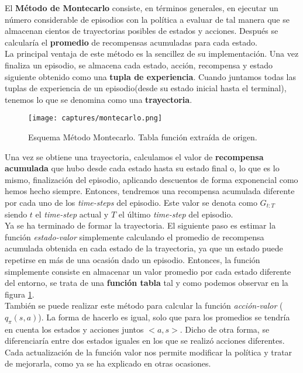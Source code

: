 \documentclass[11pt,fleqn]{book} %
\begin{document}
El \textbf{Método de Montecarlo} consiste, en términos generales, en ejecutar un número considerable de episodios con la política a evaluar de tal manera que se almacenan cientos de trayectorias posibles de estados y acciones. Después se calcularía el \textbf{promedio} de recompensas acumuladas para cada estado. \\

La principal ventaja de este método es la sencillez de su implementación. Una vez finaliza un episodio, se almacena cada estado, acción, recompensa y estado siguiente obtenido como una \textbf{tupla de experiencia}. Cuando juntamos todas las tuplas de experiencia de un episodio(desde su estado inicial hasta el terminal), tenemos lo que se denomina como una \textbf{trayectoria}. \\

\begin{figure}[H]
	\centering\texttt{[image: captures/montecarlo.png]}
	\caption{Esquema Método Montecarlo. Tabla función extraída de origen. \cite{article:RLromero}}
	\label{fig:montecarlo} %
\end{figure}

Una vez se obtiene una trayectoria, calculamos el valor de \textbf{recompensa acumulada} que hubo desde cada estado hasta su estado final o, lo que es lo mismo, finalización del episodio, aplicando descuentos de forma exponencial como hemos hecho siempre. Entonces, tendremos una recompensa acumulada diferente por cada uno de los \textit{time-steps} del episodio. Este valor se denota como $G_{t:T}$ siendo $t$ el \textit{time-step} actual y $T$ el último \textit{time-step} del episodio. \\

Ya se ha terminado de formar la trayectoria. El siguiente paso es estimar la función \textit{estado-valor} simplemente calculando el promedio de recompensa acumulada obtenida en cada estado de la trayectoria, ya que un estado puede repetirse en más de una ocasión dado un episodio. Entonces, la función simplemente consiste en almacenar un valor promedio por cada estado diferente del entorno, se trata de una \textbf{función tabla} tal y como podemos observar en la figura \ref{fig:montecarlo}.\\

También se puede realizar este método para calcular la función \textit{acción-valor} ($q_\pi(s,a)$). La forma de hacerlo es igual, solo que para los promedios se tendría en cuenta los estados y acciones juntos $<a,s>$. Dicho de otra forma, se diferenciaría entre dos estados iguales en los que se realizó acciones diferentes. Cada actualización de la función valor nos permite modificar la política y tratar de mejorarla, como ya se ha explicado en otras ocasiones.
\end{document}
